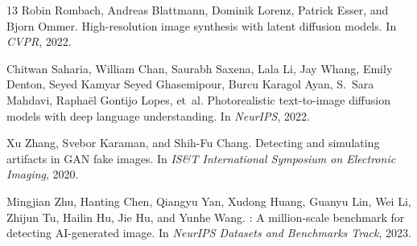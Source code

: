 \documentclass[11pt,a4paper]{article}
\begin{document}
\begin{thebibliography}{13}
Robin Rombach, Andreas Blattmann, Dominik Lorenz, Patrick Esser, and Bjorn Ommer.
\newblock High-resolution image synthesis with latent diffusion models.
\newblock In \emph{CVPR}, 2022.

Chitwan Saharia, William Chan, Saurabh Saxena, Lala Li, Jay Whang, Emily Denton, Seyed Kamyar Seyed Ghasemipour, Burcu Karagol Ayan, S.~Sara Mahdavi, Rapha{\"e}l Gontijo Lopes, et~al.
\newblock Photorealistic text-to-image diffusion models with deep language understanding.
\newblock In \emph{NeurIPS}, 2022.

Xu Zhang, Svebor Karaman, and Shih-Fu Chang.
\newblock Detecting and simulating artifacts in {GAN} fake images.
\newblock In \emph{IS\&T International Symposium on Electronic Imaging}, 2020.

Mingjian Zhu, Hanting Chen, Qiangyu Yan, Xudong Huang, Guanyu Lin, Wei Li, Zhijun Tu, Hailin Hu, Jie Hu, and Yunhe Wang.
: A million-scale benchmark for detecting {AI}-generated image.
\newblock In \emph{NeurIPS Datasets and Benchmarks Track}, 2023.

\end{thebibliography}
\end{document}
